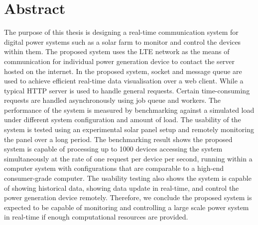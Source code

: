 \documentclass[../thesis.tex]{subfiles}
\begin{document}
\chapter*{Abstract}

The purpose of this thesis is designing a real-time communication system for digital power systems such as a solar farm to monitor and control the devices within them. The proposed system uses the LTE network as the means of communication for individual power generation device to contact the server hosted on the internet. In the proposed system, socket and message queue are used to achieve efficient real-time data visualisation over a web client. While a typical HTTP server is used to handle general requests. Certain time-consuming requests are handled asynchronously using job queue and workers. The performance of the system is measured by benchmarking against a simulated load under different system configuration and amount of load. The usability of the system is tested using an experimental solar panel setup and remotely monitoring the panel over a long period. The benchmarking result shows the proposed system is capable of processing up to 1000 devices accessing the system simultaneously at the rate of one request per device per second, running within a computer system with configurations that are comparable to a high-end consumer-grade computer. The usability testing also shows the system is capable of showing historical data, showing data update in real-time, and control the power generation device remotely. Therefore, we conclude the proposed system is expected to be capable of monitoring and controlling a large scale power system in real-time if enough computational resources are provided.
\end{document}
